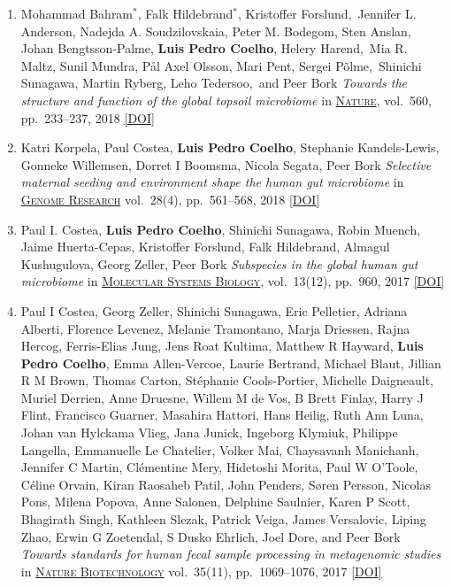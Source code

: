 \documentclass{article}
\newcommand\showdoi[1]{%
    \href{https://doi.org/#1}{[DOI]}%
}
\newcommand\pubname[1]{\textsc{\uline{#1}}}
\newcommand\contribution[1]{\relax}
\newcommand\costar{${}^{*}$}
\begin{document}
\begin{enumerate}[resume]
\item Mohammad Bahram\costar, Falk Hildebrand\costar, Kristoffer
Forslund, Jennifer L. Anderson, Nadejda A. Soudzilovskaia, Peter M. Bodegom,
Sten Anslan, Johan Bengtsson-Palme, \textbf{Luis Pedro Coelho}, Helery
Harend, Mia R. Maltz, Sunil Mundra, Pål Axel Olsson, Mari Pent, Sergei
Põlme, Shinichi Sunagawa, Martin Ryberg, Leho Tedersoo, and Peer Bork
\emph{Towards the structure and function of the global topsoil microbiome} in
\pubname{Nature}, vol.\ 560, pp.\ 233--237, 2018
\showdoi{10.1038/s41586-018-0386-6}
\contribution{I contributed to the analysis of metagenomics data, in particular
building a gene catalogue of the soil microbiome.}

\item Katri Korpela, Paul Costea, \textbf{Luis Pedro Coelho}, Stephanie
Kandels-Lewis, Gonneke Willemsen, Dorret I Boomsma, Nicola Segata, Peer Bork
\emph{Selective maternal seeding and environment shape the human gut
microbiome} in \pubname{Genome Research} vol.\ 28(4), pp.\ 561--568, 2018
\showdoi{10.1101/gr.233940.117}
\contribution{I contributed to the analysis and interpretation of the
metagenomics data.}

\item Paul I. Costea, \textbf{Luis Pedro Coelho}, Shinichi Sunagawa, Robin
Muench, Jaime Huerta-Cepas, Kristoffer Forslund, Falk Hildebrand, Almagul
Kushugulova, Georg Zeller, Peer Bork \emph{Subspecies in the global human gut
microbiome} in \pubname{Molecular Systems Biology}, vol.\ 13(12), pp.\ 960,
2017 \showdoi{10.15252/msb.20177589}
\contribution{I contributed to the analysis and interpretation of the
metagenomics data and discussions of statistical methodology.}


\item Paul I Costea, Georg Zeller, Shinichi Sunagawa, Eric Pelletier, Adriana
Alberti, Florence Levenez, Melanie Tramontano, Marja Driessen, Rajna Hercog,
Ferris-Elias Jung, Jens Roat Kultima, Matthew R Hayward, \textbf{Luis Pedro
Coelho}, Emma Allen-Vercoe, Laurie Bertrand, Michael Blaut, Jillian R M Brown,
Thomas Carton, Stéphanie Cools-Portier, Michelle Daigneault, Muriel Derrien,
Anne Druesne, Willem M de Vos, B Brett Finlay, Harry J Flint, Francisco
Guarner, Masahira Hattori, Hans Heilig, Ruth Ann Luna, Johan van Hylckama
Vlieg, Jana Junick, Ingeborg Klymiuk, Philippe Langella, Emmanuelle Le
Chatelier, Volker Mai, Chaysavanh Manichanh, Jennifer C Martin, Clémentine
Mery, Hidetoshi Morita, Paul W O'Toole, Céline Orvain, Kiran Raosaheb Patil,
John Penders, Søren Persson, Nicolas Pons, Milena Popova, Anne Salonen,
Delphine Saulnier, Karen P Scott, Bhagirath Singh, Kathleen Slezak, Patrick
Veiga, James Versalovic, Liping Zhao, Erwin G Zoetendal, S Dusko Ehrlich, Joel
Dore, and Peer Bork \emph{Towards standards for human fecal sample processing
in metagenomic studies} in \pubname{Nature Biotechnology} vol.\ 35(11), pp.\
1069--1076, 2017 \showdoi{10.1038/nbt.3960}
\contribution{I contributed in the computational analysis of the samples in the
benchmark.}


\end{enumerate}
\end{document}
